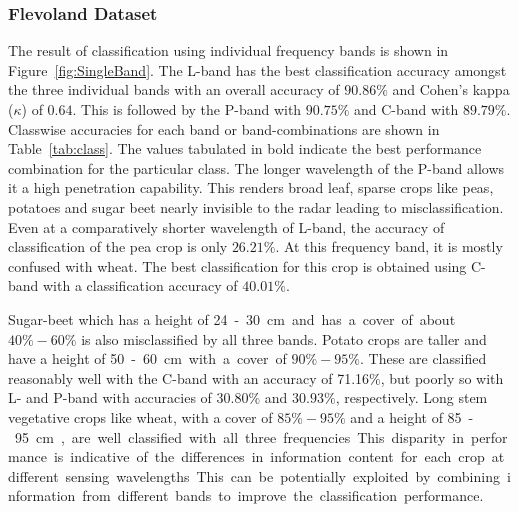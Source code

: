 \subsubsection{Flevoland Dataset}
The result of classification using individual frequency bands is shown in Figure~\ref{fig:SingleBand}. The L-band has the best classification accuracy amongst the three individual bands with an overall accuracy of $90.86\%$ and Cohen's kappa ($\kappa$) of $0.64$. This is followed by the P-band with $90.75\%$ and C-band with $89.79\%$. 
Classwise accuracies for each band or band-combinations are shown in Table~\ref{tab:class}. The values tabulated in bold indicate the best performance combination for the particular class. 
The longer wavelength of the P-band allows it a high penetration capability. This renders broad leaf, sparse crops like peas, potatoes and sugar beet nearly invisible to the radar leading to misclassification. Even at a comparatively shorter wavelength of L-band, the accuracy of classification of the pea crop is only $26.21\%$. 
At this frequency band, it is mostly confused with wheat. 
The best classification for this crop is obtained using C-band with a classification accuracy of $40.01\%$. 

Sugar-beet which has a height of \SI{24}-\SI{30}{cm} and has a cover of about $40\% - 60\%$ is also misclassified by all three bands. 
Potato crops are taller and have a height of \SI{50}-\SI{60}{cm} with a cover of $90\% - 95\%$. These are classified reasonably well with the C-band with an accuracy of 71.16\%, but poorly so with L- and P-band with accuracies of $30.80\%$ and $30.93\%$, respectively. 
Long stem vegetative crops like wheat, with a cover of $85\% - 95\%$ and a height of \SI{85}-\SI{95}{cm}, are well classified with all three frequencies. 
This disparity in performance is indicative of the differences in information content for each crop at different sensing wavelengths. This can be potentially exploited by combining information from different bands to improve the classification performance. 






